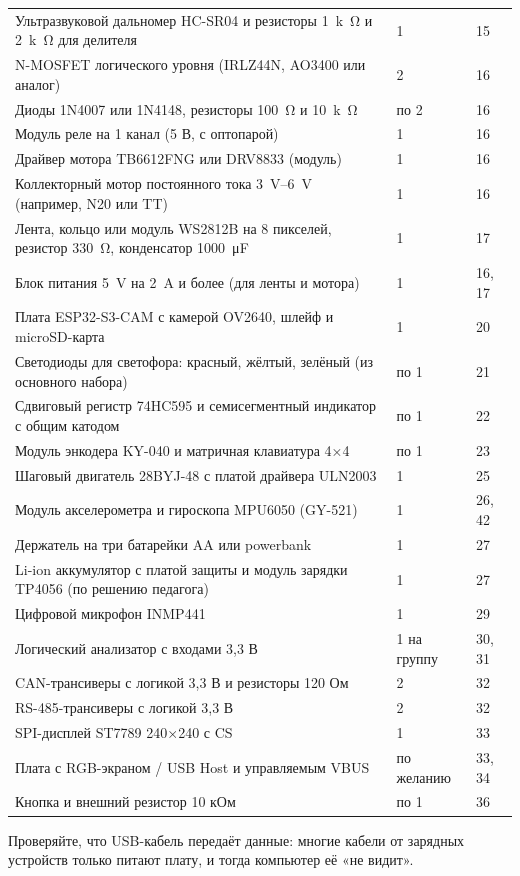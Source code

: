 {\begin{xltabular}{\textwidth}{@{}X l l@{}}
Ультразвуковой дальномер HC-SR04 и резисторы \SI{1}{k\ohm} и \SI{2}{k\ohm} для делителя & 1 & 15 \\
N-MOSFET логического уровня (IRLZ44N, AO3400 или аналог) & 2 & 16 \\
Диоды 1N4007 или 1N4148, резисторы \SI{100}{\ohm} и \SI{10}{k\ohm} & по 2 & 16 \\
Модуль реле на 1 канал (5 В, с оптопарой) & 1 & 16 \\
Драйвер мотора TB6612FNG или DRV8833 (модуль) & 1 & 16 \\
Коллекторный мотор постоянного тока \SIrange{3}{6}{V} (например, N20 или TT) & 1 & 16 \\
Лента, кольцо или модуль WS2812B на 8 пикселей, резистор \SI{330}{\ohm}, конденсатор \SI{1000}{\micro F} & 1 & 17 \\
Блок питания \SI{5}{V} на \SI{2}{A} и более (для ленты и мотора) & 1 & 16, 17 \\
Плата ESP32-S3-CAM с камерой OV2640, шлейф и microSD-карта & 1 & 20 \\
Светодиоды для светофора: красный, жёлтый, зелёный (из основного набора) & по 1 & 21 \\
Сдвиговый регистр 74HC595 и семисегментный индикатор с общим катодом & по 1 & 22 \\
Модуль энкодера KY-040 и матричная клавиатура 4×4 & по 1 & 23 \\
Шаговый двигатель 28BYJ-48 с платой драйвера ULN2003 & 1 & 25 \\
Модуль акселерометра и гироскопа MPU6050 (GY-521) & 1 & 26, 42 \\
Держатель на три батарейки AA или powerbank & 1 & 27 \\
Li-ion аккумулятор с платой защиты и модуль зарядки TP4056 (по решению педагога) & 1 & 27 \\
Цифровой микрофон INMP441 & 1 & 29 \\
Логический анализатор с входами 3,3 В & 1 на группу & 30, 31 \\
CAN-трансиверы с логикой 3,3 В и резисторы 120 Ом & 2 & 32 \\
RS-485-трансиверы с логикой 3,3 В & 2 & 32 \\
SPI-дисплей ST7789 240×240 с CS & 1 & 33 \\
Плата с RGB-экраном / USB Host и управляемым VBUS & по желанию & 33, 34 \\
Кнопка и внешний резистор 10 кОм & по 1 & 36 \\
\bottomrule
\end{xltabular}
}

\begin{tip}
Проверяйте, что USB-кабель передаёт данные: многие кабели от зарядных устройств только питают
плату, и тогда компьютер её «не видит».
\end{tip}
